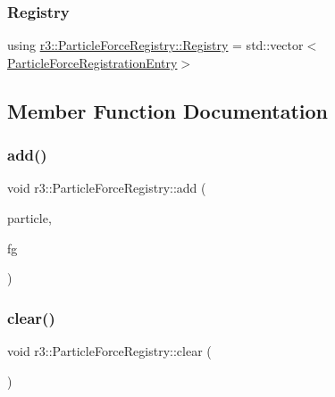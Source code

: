 \subsubsection{\texorpdfstring{Registry}{Registry}}
{\footnotesize\ttfamily using \mbox{\hyperlink{classr3_1_1_particle_force_registry_a5529157176d2c10b2afde82e6871c7eb}{r3\+::\+Particle\+Force\+Registry\+::\+Registry}} =  std\+::vector$<$\mbox{\hyperlink{structr3_1_1_particle_force_registry_1_1_particle_force_registration_entry}{Particle\+Force\+Registration\+Entry}}$>$\hspace{0.3cm}{\ttfamily [protected]}}



\subsection{Member Function Documentation}
\mbox{\label{classr3_1_1_particle_force_registry_ae8aafae43e822c8e5a3ccdde802b8aa9}} 
\subsubsection{\texorpdfstring{add()}{add()}}
{\footnotesize\ttfamily void r3\+::\+Particle\+Force\+Registry\+::add (\begin{DoxyParamCaption}\item[{\mbox{\hyperlink{classr3_1_1_particle}{Particle}} $\ast$}]{particle,  }\item[{\mbox{\hyperlink{classr3_1_1_particle_force_generator}{Particle\+Force\+Generator}} $\ast$}]{fg }\end{DoxyParamCaption})}

\mbox{\label{classr3_1_1_particle_force_registry_ac49c38fa041447278c56e68c6e796d77}} 
\subsubsection{\texorpdfstring{clear()}{clear()}}
{\footnotesize\ttfamily void r3\+::\+Particle\+Force\+Registry\+::clear (\begin{DoxyParamCaption}{ }\end{DoxyParamCaption})}

